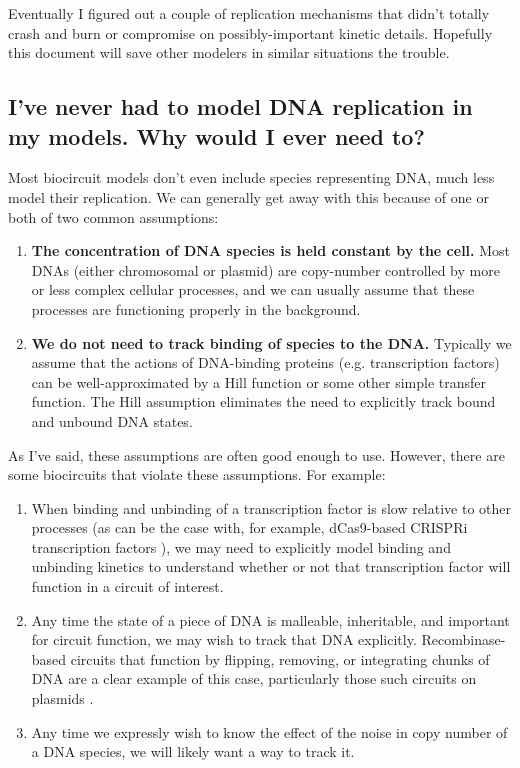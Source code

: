 \documentclass[preprint,12pt]{oldplainarticle}
\begin{document}
Eventually I figured out a couple of replication mechanisms that didn't totally crash and burn or compromise on possibly-important kinetic details. Hopefully this document will save other modelers in similar situations the trouble.

\subsection{I've never had to model DNA replication in my models. Why would I ever need to?}

Most biocircuit models don't even include species representing DNA, much less model their replication. We can generally get away with this because of one or both of two common assumptions:

\begin{enumerate}
	\item \textbf{The concentration of DNA species is held constant by the cell.} Most DNAs (either chromosomal or plasmid) are copy-number controlled by more or less complex cellular processes, and we can usually assume that these processes are functioning properly in the background.
	\item \textbf{We do not need to track binding of species to the DNA.} Typically we assume that the actions of DNA-binding proteins (e.g. transcription factors) can be well-approximated by a Hill function or some other simple transfer function. The Hill assumption eliminates the need to explicitly track bound and unbound DNA states.
\end{enumerate}

As I've said, these assumptions are often good enough to use. However, there are some biocircuits that violate these assumptions. For example:

\begin{enumerate}
	\item When binding and unbinding of a transcription factor is slow relative to other processes (as can be the case with, for example, dCas9-based CRISPRi transcription factors \cite{Jones2017}), we may need to explicitly model binding and unbinding kinetics to understand whether or not that transcription factor will function in a circuit of interest. 
	\item Any time the state of a piece of DNA is malleable, inheritable, and important for circuit function, we may wish to track that DNA explicitly. Recombinase-based circuits that function by flipping, removing, or integrating chunks of DNA are a clear example of this case, particularly those such circuits on plasmids \cite{roquet2016, hsiao2016}.
	\item Any time we expressly wish to know the effect of the noise in copy number of a DNA species, we will likely want a way to track it. 
\end{enumerate}
\end{document}
